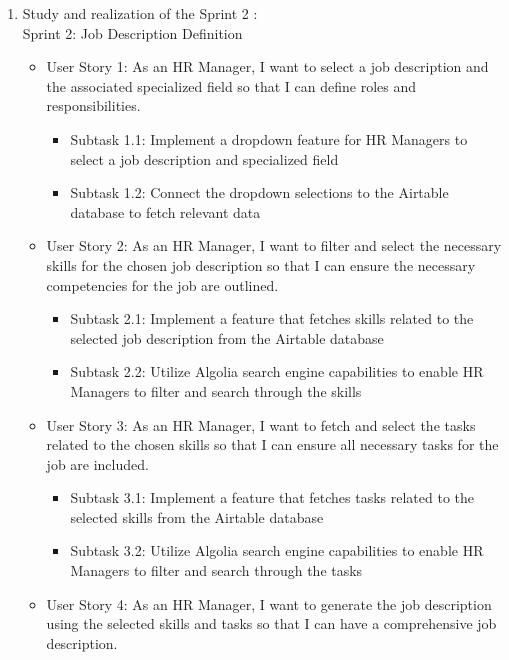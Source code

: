\begin{enumerate}
    \item Study and realization of the Sprint 2 : \\
    Sprint 2: Job Description Definition
    \begin{itemize}
        \renewcommand\labelitemi{-}
        \item User Story 1: As an HR Manager, I want to select a job description and the associated specialized field so that I can define roles and responsibilities. \\
        \begin{itemize}
            \item Subtask 1.1: Implement a dropdown feature for HR Managers to select a job description and specialized field
            \item Subtask 1.2: Connect the dropdown selections to the Airtable database to fetch relevant data
        \end{itemize}    
        \item User Story 2: As an HR Manager, I want to filter and select the necessary skills for the chosen job description so that I can ensure the necessary competencies for the job are outlined. \\
        \begin{itemize}
            \item Subtask 2.1: Implement a feature that fetches skills related to the selected job description from the Airtable database
            \item Subtask 2.2: Utilize Algolia search engine capabilities to enable HR Managers to filter and search through the skills
        \end{itemize}   
        \item User Story 3: As an HR Manager, I want to fetch and select the tasks related to the chosen skills so that I can ensure all necessary tasks for the job are included. \\
        \begin{itemize}
            \item Subtask 3.1: Implement a feature that fetches tasks related to the selected skills from the Airtable database
            \item Subtask 3.2: Utilize Algolia search engine capabilities to enable HR Managers to filter and search through the tasks
        \end{itemize}   
        \item User Story 4: As an HR Manager, I want to generate the job description using the selected skills and tasks so that I can have a comprehensive job description. \\

\end{itemize}
\end{enumerate}

